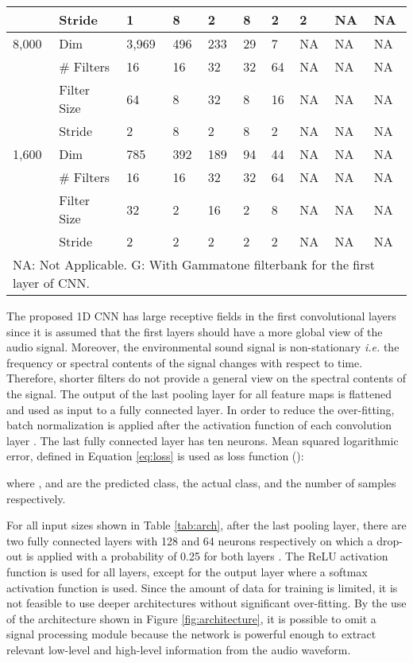 \documentclass[preprint,final,12pt]{elsarticle}
\begin{document}
\begin{table*}[htpb!]
\begin{tabular}{llllllllll}
                        & Stride      & 1      & 8     & 2     & 8   & 2   & 2   & NA & NA \\ \hline
{8,000}  & Dim         & 3,969  & 496   & 233   & 29  & 7   & NA & NA & NA \\
                        & \# Filters  & 16     & 16    & 32    & 32  & 64  & NA & NA & NA \\
                        & Filter Size & 64     & 8     & 32    & 8   & 16  & NA & NA & NA \\
                        & Stride      & 2      & 8     & 2     & 8   & 2   & NA & NA & NA \\ \hline
{1,600}  & Dim         & 785    & 392   & 189   & 94  & 44  & NA & NA & NA \\
                        & \# Filters  & 16     & 16    & 32    & 32  & 64  & NA & NA & NA \\
                        & Filter Size & 32     & 2     & 16    & 2   & 8   & NA & NA & NA \\
                        & Stride      & 2      & 2     & 2     & 2   & 2   & NA & NA & NA \\ \hline
\multicolumn{10}{l}{\scriptsize{NA: Not Applicable.
G: With Gammatone filterbank for the first layer of CNN.}}
\end{tabular}
\label{tab:arch} \end{table*}

The proposed 1D CNN has large receptive fields in the first convolutional layers since it is assumed that the first layers should have a more global view of the audio signal. Moreover, the environmental sound signal is non-stationary \textit{i.e.} the frequency or spectral contents of the signal changes with respect to time. Therefore, shorter filters do not provide a general view on the spectral contents of the signal. The output of the last pooling layer for all feature maps is flattened and used as input to a fully connected layer. In order to reduce the over-fitting, batch normalization is applied after the activation function of each convolution layer \citep{ioffe2015batch}. The last fully connected layer has ten neurons. Mean squared logarithmic error, defined in Equation \ref{eq:loss} is used as loss function ():



\noindent where ,  and  are the predicted class, the actual class, and the number of samples respectively.

For all input sizes shown in Table \ref{tab:arch}, after the last pooling layer, there are two fully connected layers with 128 and 64 neurons respectively on which a drop-out is applied with a probability of 0.25 for both layers \citep{srivastava2014dropout}. The ReLU activation function  is used for all layers, except for the output layer where a softmax activation function is used. Since the amount of data for training is limited, it is not feasible to use deeper architectures without significant over-fitting. By the use of the architecture shown in Figure \ref{fig:architecture}, it is possible to omit a signal processing module because the network is powerful enough to extract relevant low-level and high-level information from the audio waveform.
\end{document}
